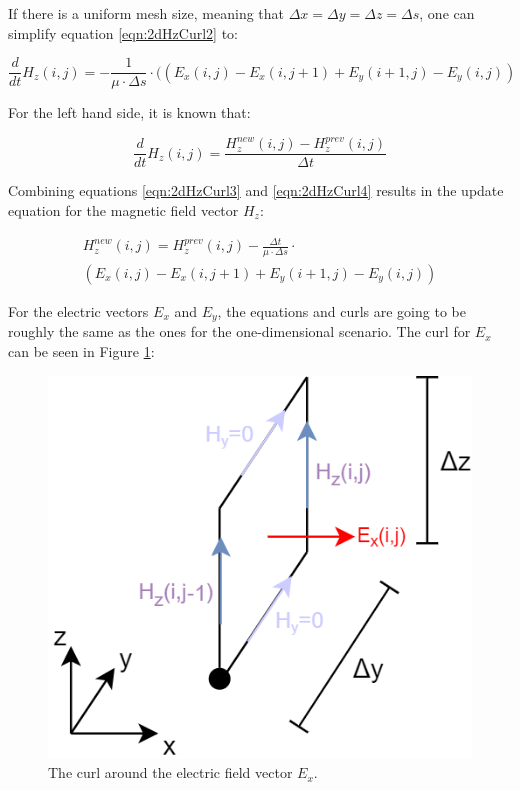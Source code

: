 If there is a uniform mesh size, meaning that $\Delta x = \Delta y =  \Delta z = \Delta s$, one can simplify equation \ref{eqn:2dHzCurl2} to:

\begin{equation}
	\label{eqn:2dHzCurl3}
	\frac{d}{dt} H_z(i,j) = -\frac{1}{\mu \cdot \Delta s} \cdot ((E_x(i,j) - E_x(i,j+1) + E_y(i+1,j)- E_y(i,j))
\end{equation}

For the left hand side, it is known that:

\begin{equation}
	\label{eqn:2dHzCurl4}
	\frac{d}{dt} H_z(i,j) = \frac{H_z^{new}(i,j) - H_z^{prev}(i,j)}{\Delta t}
\end{equation}

Combining equations \ref{eqn:2dHzCurl3} and \ref{eqn:2dHzCurl4} results in the update equation for the magnetic field vector $H_z$:

\begin{multline}
	\label{eqn:2dHzCurlFinal}
	H_z^{new}(i,j) =  H_z^{prev}(i,j) -\frac{\Delta t}{\mu \cdot \Delta s} \cdot \\ (E_x(i,j) - E_x(i,j+1) + E_y(i+1,j)- E_y(i,j))
\end{multline}

For the electric vectors $E_x$ and $E_y$, the equations and curls are going to be roughly the same as the ones for the one-dimensional scenario. The curl for $E_x$ can be seen in Figure \ref{fig:fdtd2dEx}:

\begin{figure}[h!]
	\centering
	\includegraphics[scale=0.6]{Figures/fdtd2dEx}
	\decoRule
	\caption[2D TE Mode - $E_x$ vector curl]{The curl around the electric field vector $E_x$.}
	\label{fig:fdtd2dEx}
\end{figure}

